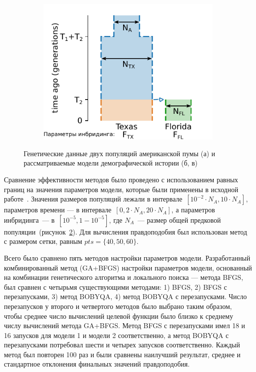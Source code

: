 \begin{figure}[ht]
\begin{subfigure}[b]{.33\textwidth}
    \caption{}
    \label{fig:part2:experiments:puma:model_1}
    \end{subfigure}%
    \begin{subfigure}[b]{.33\textwidth}
    \includegraphics[width=\textwidth]{images_experiments/puma/picture_puma_model_2.pdf}
    \caption{}
    \label{fig:part2:experiments:puma:model_2}
    \end{subfigure}
    \caption{Генетические данные двух популяций американской пумы (а) и рассматриваемые модели демографической истории (б, в)}
    \label{fig:part2:experiments:puma:data_and_models}
\end{figure}

Сравнение эффективности методов было проведено с использованием равных границ на значения параметров модели, которые были применены в исходной работе~\cite{blischak2020inferring}.
Значения размеров популяций лежали в интервале~${[10^{-2}\cdot N_A, 10 \cdot N_A]}$, параметров времени --- в интервале~${[0{,}2\cdot N_A, 20 \cdot N_A]}$, а параметров инбридинга~--- в~${[10^{-5},1-10^{-5}]}$, где $N_A$~--- размер общей предковой популяции~(рисунок~\ref{fig:part2:experiments:puma:model_2}).
Для вычисления правдоподобия был использован метод \dadi с размером сетки, равным $pts=\{40, 50, 60\}$.

Всего было сравнено пять методов настройки параметров модели.
Разработанный комбинированный метод (GA+BFGS) настройки параметров модели, основанный на комбинации генетического алгоритма и локального поиска --- метода BFGS, был сравнен с четырьмя существующими методами: 1) BFGS, 2) BFGS с перезапусками, 3) метод BOBYQA, 4) метод BOBYQA с перезапусками.
Число перезапусков у второго и четвертого методов было выбрано таким образом, чтобы среднее число вычислений целевой функции было близко к среднему числу вычислений метода GA+BFGS.
Метод BFGS с перезапусками имел 18 и 16 запусков для модели 1 и модели 2 соответственно, а метод BOBYQA с перезапусками потребовал шести и четырех запусков соответственно.
Каждый метод был повторен 100 раз и были сравнены наилучший результат, среднее и стандартное отклонения финальных значений правдоподобия.


